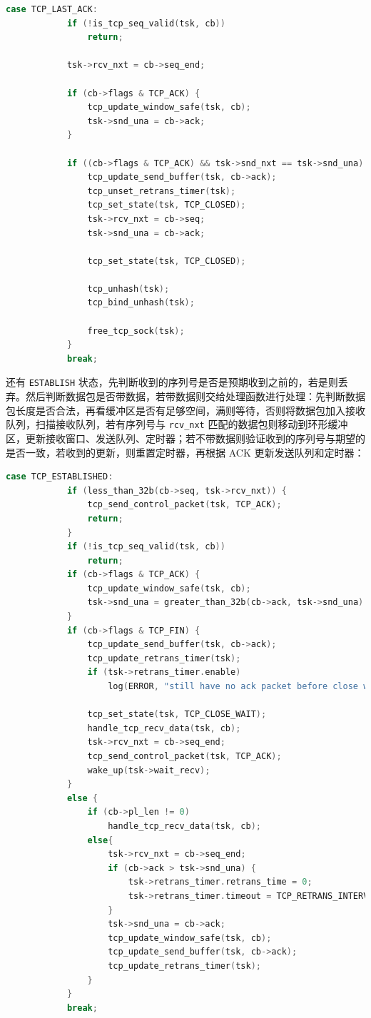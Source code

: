 \documentclass[UTF8]{report}
\begin{document}
\begin{enumerate}
\begin{lstlisting}[language=C]
        case TCP_LAST_ACK: 
			if (!is_tcp_seq_valid(tsk, cb))
				return;

			tsk->rcv_nxt = cb->seq_end;

			if (cb->flags & TCP_ACK) {
				tcp_update_window_safe(tsk, cb);
				tsk->snd_una = cb->ack;
			}

			if ((cb->flags & TCP_ACK) && tsk->snd_nxt == tsk->snd_una) {
				tcp_update_send_buffer(tsk, cb->ack);
				tcp_unset_retrans_timer(tsk);
				tcp_set_state(tsk, TCP_CLOSED);
				tsk->rcv_nxt = cb->seq;
				tsk->snd_una = cb->ack;

				tcp_set_state(tsk, TCP_CLOSED);

				tcp_unhash(tsk);
				tcp_bind_unhash(tsk);

				free_tcp_sock(tsk);
			}
			break;
    \end{lstlisting}

    还有 \texttt{ESTABLISH} 状态，先判断收到的序列号是否是预期收到之前的，若是则丢弃。然后判断数据包是否带数据，若带数据则交给处理函数进行处理：先判断数据包长度是否合法，再看缓冲区是否有足够空间，满则等待，否则将数据包加入接收队列，扫描接收队列，若有序列号与 \texttt{rcv\_nxt} 匹配的数据包则移动到环形缓冲区，更新接收窗口、发送队列、定时器；若不带数据则验证收到的序列号与期望的是否一致，若收到的更新，则重置定时器，再根据 ACK 更新发送队列和定时器：

    \begin{lstlisting}[language=C]
        case TCP_ESTABLISHED: 
            if (less_than_32b(cb->seq, tsk->rcv_nxt)) {
                tcp_send_control_packet(tsk, TCP_ACK);
                return;
            }
            if (!is_tcp_seq_valid(tsk, cb))
                return;
            if (cb->flags & TCP_ACK) {
                tcp_update_window_safe(tsk, cb);
                tsk->snd_una = greater_than_32b(cb->ack, tsk->snd_una) ? cb->ack : tsk->snd_una;;
            }
            if (cb->flags & TCP_FIN) {
                tcp_update_send_buffer(tsk, cb->ack);
                tcp_update_retrans_timer(tsk);
                if (tsk->retrans_timer.enable)
                    log(ERROR, "still have no ack packet before close wait\n");

                tcp_set_state(tsk, TCP_CLOSE_WAIT);
                handle_tcp_recv_data(tsk, cb);
                tsk->rcv_nxt = cb->seq_end;
                tcp_send_control_packet(tsk, TCP_ACK);
                wake_up(tsk->wait_recv);
            } 
            else {
                if (cb->pl_len != 0)
                    handle_tcp_recv_data(tsk, cb);
                else{
                    tsk->rcv_nxt = cb->seq_end;
                    if (cb->ack > tsk->snd_una) {
                        tsk->retrans_timer.retrans_time = 0;
                        tsk->retrans_timer.timeout = TCP_RETRANS_INTERVAL_INITIAL;
                    }
                    tsk->snd_una = cb->ack;
                    tcp_update_window_safe(tsk, cb);
                    tcp_update_send_buffer(tsk, cb->ack);
                    tcp_update_retrans_timer(tsk);
                }
            }
            break;


\end{lstlisting}
\end{enumerate}
\end{document}
